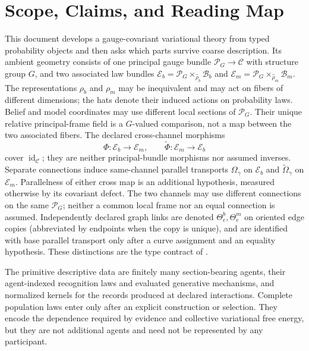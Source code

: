 \chapter{Scope, Claims, and Reading Map}
\label{ch:introduction}

This document develops a gauge-covariant variational theory from typed
probability objects and then asks which parts survive coarse description.  Its
ambient geometry consists of one principal gauge bundle
\(\mathscr P_G\to\mathcal C\) with structure group \(G\), and two associated law bundles
\(\mathcal E_b=\mathscr P_G\times_{\widehat\rho_b}\mathcal B_b\) and
\(\mathcal E_m=\mathscr P_G\times_{\widehat\rho_m}\mathcal B_m\).  The representations
\(\rho_b\) and \(\rho_m\) may be inequivalent and may act on fibers of
different dimensions; the hats denote their induced actions on probability
laws.  Belief and model coordinates may use different local sections of
\(\mathscr P_G\).  Their unique relative principal-frame field is a \(G\)-valued
comparison, not a map between the two associated fibers.  The declared
cross-channel
morphisms
\[
\Phi:\mathcal E_b\longrightarrow\mathcal E_m,
\qquad
\widetilde\Phi:\mathcal E_m\longrightarrow\mathcal E_b
\]
cover \(\operatorname{id}_{\mathcal C}\); they are neither principal-bundle
morphisms nor assumed inverses.  Separate connections induce same-channel
parallel transports \(\Omega_\gamma\) on \(\mathcal E_b\) and
\(\widetilde\Omega_\gamma\) on \(\mathcal E_m\).  Parallelness of either cross
map is an additional hypothesis, measured otherwise by its covariant defect.
The two channels may use different connections on the same \(\mathscr P_G\); neither a
common local frame nor an equal connection is assumed.
Independently declared graph links are denoted
\(\Theta^b_e,\Theta^m_e\) on oriented edge copies (abbreviated by endpoints
when the copy is unique), and are identified with base parallel transport
only after a curve assignment and an equality hypothesis. These
distinctions are the type contract of . 

The primitive descriptive data are finitely many section-bearing agents, their
agent-indexed recognition laws and evaluated generative mechanisms, and normalized
kernels for the records produced at declared interactions.  Complete population laws
enter only after an explicit construction or selection.  They encode the dependence
required by evidence and collective variational free energy, but they are not additional
agents and need not be represented by any participant.  

